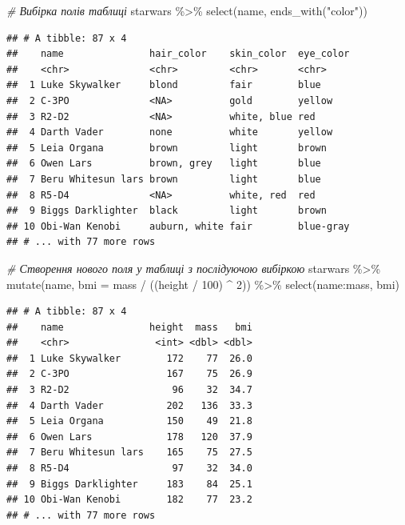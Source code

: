 \documentclass[
]{book}
\newenvironment{Shaded}{\begin{snugshade}}{\end{snugshade}}
\newcommand{\AttributeTok}[1]{\textcolor[rgb]{0.77,0.63,0.00}{#1}}
\newcommand{\CommentTok}[1]{\textcolor[rgb]{0.56,0.35,0.01}{\textit{#1}}}
\newcommand{\DecValTok}[1]{\textcolor[rgb]{0.00,0.00,0.81}{#1}}
\newcommand{\FunctionTok}[1]{\textcolor[rgb]{0.00,0.00,0.00}{#1}}
\newcommand{\NormalTok}[1]{#1}
\newcommand{\SpecialCharTok}[1]{\textcolor[rgb]{0.00,0.00,0.00}{#1}}
\newcommand{\StringTok}[1]{\textcolor[rgb]{0.31,0.60,0.02}{#1}}
\begin{document}
\begin{Shaded}
\begin{Highlighting}[]
\CommentTok{\# Вибірка полів таблиці}
\NormalTok{starwars }\SpecialCharTok{\%\textgreater{}\%} 
  \FunctionTok{select}\NormalTok{(name, }\FunctionTok{ends\_with}\NormalTok{(}\StringTok{"color"}\NormalTok{))}
\end{Highlighting}
\end{Shaded}

\begin{verbatim}
## # A tibble: 87 x 4
##    name               hair_color    skin_color  eye_color
##    <chr>              <chr>         <chr>       <chr>    
##  1 Luke Skywalker     blond         fair        blue     
##  2 C-3PO              <NA>          gold        yellow   
##  3 R2-D2              <NA>          white, blue red      
##  4 Darth Vader        none          white       yellow   
##  5 Leia Organa        brown         light       brown    
##  6 Owen Lars          brown, grey   light       blue     
##  7 Beru Whitesun lars brown         light       blue     
##  8 R5-D4              <NA>          white, red  red      
##  9 Biggs Darklighter  black         light       brown    
## 10 Obi-Wan Kenobi     auburn, white fair        blue-gray
## # ... with 77 more rows
\end{verbatim}

\begin{Shaded}
\begin{Highlighting}[]
\CommentTok{\# Створення нового поля у таблиці з послідуючою вибіркою}
\NormalTok{starwars }\SpecialCharTok{\%\textgreater{}\%} 
  \FunctionTok{mutate}\NormalTok{(name, }\AttributeTok{bmi =}\NormalTok{ mass }\SpecialCharTok{/}\NormalTok{ ((height }\SpecialCharTok{/} \DecValTok{100}\NormalTok{)  }\SpecialCharTok{\^{}} \DecValTok{2}\NormalTok{)) }\SpecialCharTok{\%\textgreater{}\%}
  \FunctionTok{select}\NormalTok{(name}\SpecialCharTok{:}\NormalTok{mass, bmi)}
\end{Highlighting}
\end{Shaded}

\begin{verbatim}
## # A tibble: 87 x 4
##    name               height  mass   bmi
##    <chr>               <int> <dbl> <dbl>
##  1 Luke Skywalker        172    77  26.0
##  2 C-3PO                 167    75  26.9
##  3 R2-D2                  96    32  34.7
##  4 Darth Vader           202   136  33.3
##  5 Leia Organa           150    49  21.8
##  6 Owen Lars             178   120  37.9
##  7 Beru Whitesun lars    165    75  27.5
##  8 R5-D4                  97    32  34.0
##  9 Biggs Darklighter     183    84  25.1
## 10 Obi-Wan Kenobi        182    77  23.2
## # ... with 77 more rows
\end{verbatim}
\end{document}
